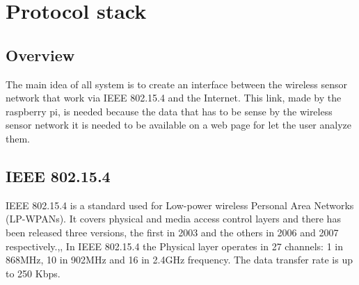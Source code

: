 \section{Protocol stack}
\subsection{Overview}
The main idea of all system is to create an interface between the wireless sensor network that work via IEEE 802.15.4 and the Internet. This link, made by the raspberry pi, is needed because the data that has to be sense by the wireless sensor network it is needed to be available on a web page for let the user analyze them. \\
\subsection{IEEE 802.15.4}
IEEE 802.15.4 is a standard used for Low-power wireless Personal Area Networks (LP-WPANs). It covers physical and media access control layers and there has been released three versions, the first in 2003 and the others in 2006 and 2007 respectively.,,
In IEEE 802.15.4 the Physical layer operates in 27 channels: 1 in 868MHz, 10 in 902MHz and 16 in 2.4GHz frequency. The data transfer rate is up to 250 Kbps.\cite{slide}\\

